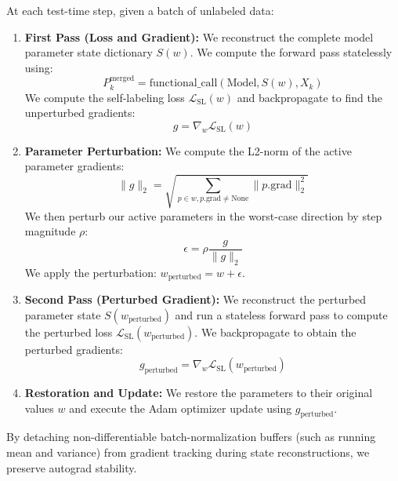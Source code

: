 \documentclass{article}
\begin{document}
At each test-time step, given a batch of unlabeled data:
\begin{enumerate}
    \item \textbf{First Pass (Loss and Gradient):} We reconstruct the complete model parameter state dictionary $S(w)$. We compute the forward pass statelessly using:
    \begin{equation}
        P_k^{\text{merged}} = \text{functional\_call}(\text{Model}, S(w), X_k)
    \end{equation}
    We compute the self-labeling loss $\mathcal{L}_{\text{SL}}(w)$ and backpropagate to find the unperturbed gradients:
    \begin{equation}
        g = \nabla_w \mathcal{L}_{\text{SL}}(w)
    \end{equation}
    \item \textbf{Parameter Perturbation:} We compute the L2-norm of the active parameter gradients:
    \begin{equation}
        \parallel g \parallel_2 = \sqrt{\sum_{p \in w, p.\text{grad} \neq \text{None}} \parallel p.\text{grad} \parallel_2^2}
    \end{equation}
    We then perturb our active parameters in the worst-case direction by step magnitude $\rho$:
    \begin{equation}
        \epsilon = \rho \frac{g}{\parallel g \parallel_2}
    \end{equation}
    We apply the perturbation: $w_{\text{perturbed}} = w + \epsilon$.
    \item \textbf{Second Pass (Perturbed Gradient):} We reconstruct the perturbed parameter state $S(w_{\text{perturbed}})$ and run a stateless forward pass to compute the perturbed loss $\mathcal{L}_{\text{SL}}(w_{\text{perturbed}})$. We backpropagate to obtain the perturbed gradients:
    \begin{equation}
        g_{\text{perturbed}} = \nabla_w \mathcal{L}_{\text{SL}}(w_{\text{perturbed}})
    \end{equation}
    \item \textbf{Restoration and Update:} We restore the parameters to their original values $w$ and execute the Adam optimizer update using $g_{\text{perturbed}}$.
\end{enumerate}

By detaching non-differentiable batch-normalization buffers (such as running mean and variance) from gradient tracking during state reconstructions, we preserve autograd stability.
\end{document}
